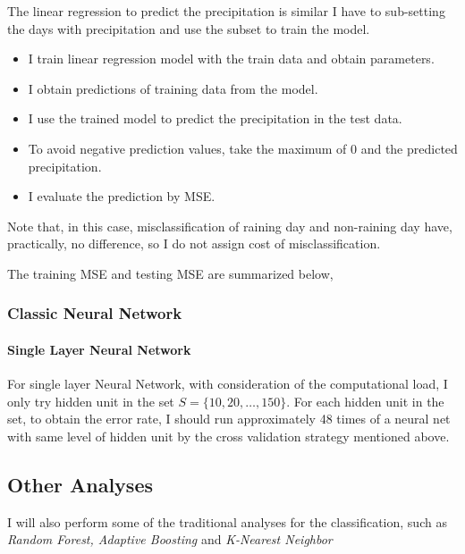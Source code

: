 \documentclass[a4paper,11pt]{article}
\newcommand{\set}[1]{\lbrace #1 \rbrace}
\begin{document}
The linear regression to predict the precipitation is similar I have to sub-setting the days with precipitation and use the subset to train the model.

\begin{itemize}
	\item I train linear regression model with the train data and obtain parameters.
	\item I obtain predictions of training data from the model.
	\item I use the trained model to predict the precipitation in the test data.
	\item To avoid negative prediction values, take the maximum of 0 and the predicted precipitation.
	\item I evaluate the prediction by MSE.
\end{itemize}
Note that, in this case, misclassification of raining day and non-raining day have, practically, no difference, so I do not assign cost of misclassification. 

The training MSE and testing MSE are summarized below,

\subsubsection{Classic Neural Network}

\paragraph{Single Layer Neural Network} For single layer Neural Network, with consideration of the computational load, I only try hidden unit in the set $S = \set{10,20,\ldots,150}$. For each hidden unit in the set, to obtain the error rate, I should run approximately 48 times of a neural net with same level of hidden unit by the cross validation strategy mentioned above.



\subsection{Other Analyses}
I will also perform some of the traditional analyses for the classification, such as \emph{Random Forest, Adaptive Boosting} and \emph{K-Nearest Neighbor} 

\newpage
\end{document}
